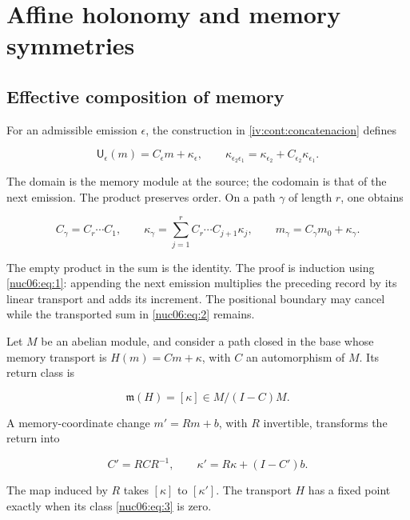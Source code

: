 \section{Affine holonomy and memory symmetries}
\label{nuclear:6}
\subsection{Effective composition of memory}

For an admissible emission \(\epsilon\), the construction in \cref{iv:cont:concatenacion} defines

\begin{equation}
\mathsf U_\epsilon(m)=C_\epsilon m+\kappa_\epsilon,
\qquad
\kappa_{\epsilon_2\epsilon_1}
=\kappa_{\epsilon_2}+C_{\epsilon_2}\kappa_{\epsilon_1}.
\label{nuc06:eq:1}
\end{equation}

The domain is the memory module at the source; the codomain is that of the next emission. The product preserves order. On a path \(\gamma\) of length \(r\), one obtains

\begin{equation}
C_\gamma=C_r\cdots C_1,\qquad
\kappa_\gamma=\sum_{j=1}^r C_r\cdots C_{j+1}\kappa_j,
\qquad
m_\gamma=C_\gamma m_0+\kappa_\gamma.
\label{nuc06:eq:2}
\end{equation}

The empty product in the sum is the identity. The proof is induction using \eqref{nuc06:eq:1}: appending the next emission multiplies the preceding record by its linear transport and adds its increment. The positional boundary may cancel while the transported sum in \eqref{nuc06:eq:2} remains.

\begin{proposition}

Let \(M\) be an abelian module, and consider a path closed in the base whose memory transport is \(H(m)=Cm+\kappa\), with \(C\) an automorphism of \(M\). Its return class is

\begin{equation}
\mathfrak m(H)=[\kappa]\in M/(I-C)M.
\label{nuc06:eq:3}
\end{equation}

A memory-coordinate change \(m'=Rm+b\), with \(R\) invertible, transforms the return into

\begin{equation}
C'=RCR^{-1},\qquad
\kappa'=R\kappa+(I-C')b.
\label{nuc06:eq:4}
\end{equation}

The map induced by \(R\) takes \([\kappa]\) to \([\kappa']\). The transport \(H\) has a fixed point exactly when its class \eqref{nuc06:eq:3} is zero.
\end{proposition}

